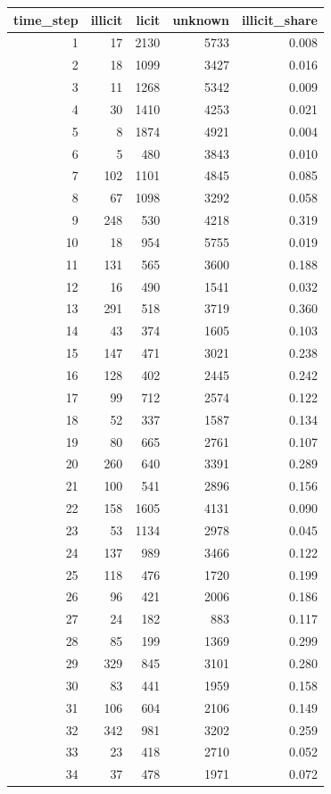 \begin{tabular}{rrrrr}
\toprule
time_step & illicit & licit & unknown & illicit_share \\
\midrule
1 & 17 & 2130 & 5733 & 0.008 \\
2 & 18 & 1099 & 3427 & 0.016 \\
3 & 11 & 1268 & 5342 & 0.009 \\
4 & 30 & 1410 & 4253 & 0.021 \\
5 & 8 & 1874 & 4921 & 0.004 \\
6 & 5 & 480 & 3843 & 0.010 \\
7 & 102 & 1101 & 4845 & 0.085 \\
8 & 67 & 1098 & 3292 & 0.058 \\
9 & 248 & 530 & 4218 & 0.319 \\
10 & 18 & 954 & 5755 & 0.019 \\
11 & 131 & 565 & 3600 & 0.188 \\
12 & 16 & 490 & 1541 & 0.032 \\
13 & 291 & 518 & 3719 & 0.360 \\
14 & 43 & 374 & 1605 & 0.103 \\
15 & 147 & 471 & 3021 & 0.238 \\
16 & 128 & 402 & 2445 & 0.242 \\
17 & 99 & 712 & 2574 & 0.122 \\
18 & 52 & 337 & 1587 & 0.134 \\
19 & 80 & 665 & 2761 & 0.107 \\
20 & 260 & 640 & 3391 & 0.289 \\
21 & 100 & 541 & 2896 & 0.156 \\
22 & 158 & 1605 & 4131 & 0.090 \\
23 & 53 & 1134 & 2978 & 0.045 \\
24 & 137 & 989 & 3466 & 0.122 \\
25 & 118 & 476 & 1720 & 0.199 \\
26 & 96 & 421 & 2006 & 0.186 \\
27 & 24 & 182 & 883 & 0.117 \\
28 & 85 & 199 & 1369 & 0.299 \\
29 & 329 & 845 & 3101 & 0.280 \\
30 & 83 & 441 & 1959 & 0.158 \\
31 & 106 & 604 & 2106 & 0.149 \\
32 & 342 & 981 & 3202 & 0.259 \\
33 & 23 & 418 & 2710 & 0.052 \\
34 & 37 & 478 & 1971 & 0.072 \\

\end{tabular}
